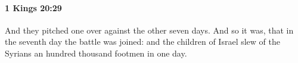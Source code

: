 
		\paragraph{1 Kings 20:29} %
			\label{1KINGS-20-29}

			And they pitched one over against the other seven days. And so it was, that in the seventh day the battle was joined: and the children of Israel slew of the Syrians an hundred thousand footmen in one day.


